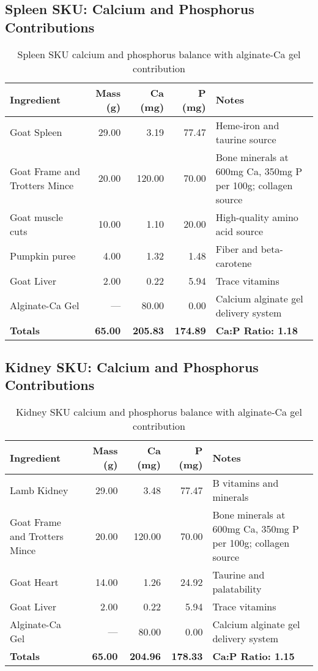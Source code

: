 \subsection*{Spleen SKU: Calcium and Phosphorus Contributions}  
\begin{table}[htbp]  
\centering  
\begin{tabular}{@{}l r r r p{7.0cm}@{}}  
\toprule  
Ingredient & Mass (g) & Ca (mg) & P (mg) & Notes \\  
\midrule  
Goat Spleen & 29.00 & 3.19 & 77.47 & Heme-iron and taurine source \\
Goat Frame and Trotters Mince & 20.00 & 120.00 & 70.00 & Bone minerals at 600mg Ca, 350mg P per 100g; collagen source \cite{gopalakrishnan2019bonecomposition,usdaFDCbone2021}\\
Goat muscle cuts & 10.00 & 1.10 & 20.00 & High-quality amino acid source \\
Pumpkin puree & 4.00 & 1.32 & 1.48 & Fiber and beta-carotene \\
Goat Liver & 2.00 & 0.22 & 5.94 & Trace vitamins \\
Alginate-Ca Gel & --- & 80.00 & 0.00 & Calcium alginate gel delivery system \\
\midrule
\textbf{Totals} & \textbf{65.00} & \textbf{205.83} & \textbf{174.89} & \textbf{Ca:P Ratio: 1.18} \\
\bottomrule  
\end{tabular}  
\caption*{Spleen SKU calcium and phosphorus balance with alginate-Ca gel contribution}  
\end{table}  

\vspace{1em}  

\subsection*{Kidney SKU: Calcium and Phosphorus Contributions}  
\begin{table}[htbp]  
\centering  
\begin{tabular}{@{}l r r r p{7.0cm}@{}}  
\toprule  
Ingredient & Mass (g) & Ca (mg) & P (mg) & Notes \\  
\midrule  
Lamb Kidney & 29.00 & 3.48 & 77.47 & B vitamins and minerals \\
Goat Frame and Trotters Mince & 20.00 & 120.00 & 70.00 & Bone minerals at 600mg Ca, 350mg P per 100g; collagen source \cite{gopalakrishnan2019bonecomposition,usdaFDCbone2021}\\
Goat Heart & 14.00 & 1.26 & 24.92 & Taurine and palatability \\
Goat Liver & 2.00 & 0.22 & 5.94 & Trace vitamins \\
Alginate-Ca Gel & --- & 80.00 & 0.00 & Calcium alginate gel delivery system \\
\midrule
\textbf{Totals} & \textbf{65.00} & \textbf{204.96} & \textbf{178.33} & \textbf{Ca:P Ratio: 1.15} \\
\bottomrule  
\end{tabular}  
\caption*{Kidney SKU calcium and phosphorus balance with alginate-Ca gel contribution}  
\end{table}  

